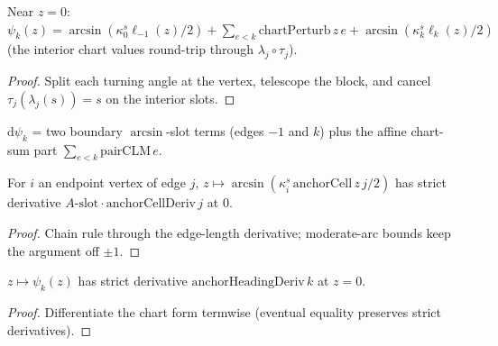 \begin{lemma}
  \label{lem:heading_anchor_cell_eventually_eq}
  Near $z = 0$: $\psi_k(z) = \arcsin(\kappa^s_0 \ell_{-1}(z)/2) +
  \sum_{e<k} \mathrm{chartPerturb}\,z\,e + \arcsin(\kappa^s_k \ell_k(z)/2)$
  (the interior chart values round-trip through $\lambda_j \circ \tau_j$).
\end{lemma}
\begin{proof}

\leanok
  Split each turning angle at the vertex, telescope the block, and cancel
  $\tau_j(\lambda_j(s)) = s$ on the interior slots.
\end{proof}

\begin{definition}
  \label{def:anchor_heading_deriv}
  $\mathrm{d}\psi_k$ = two boundary $\arcsin$-slot terms (edges $-1$ and $k$)
  plus the affine chart-sum part $\sum_{e<k} \mathrm{pairCLM}\,e$.
\end{definition}

\begin{lemma}
  \label{lem:has_strict_fderiv_at_anchor_slot}
  For $i$ an endpoint vertex of edge $j$,
  $z \mapsto \arcsin(\kappa^s_i\,\mathrm{anchorCell}\,z\,j/2)$ has strict
  derivative $A\text{-slot} \cdot \mathrm{anchorCellDeriv}\,j$ at $0$.
\end{lemma}
\begin{proof}

\leanok
  Chain rule through the edge-length derivative; moderate-arc bounds keep the
  argument off $\pm1$.
\end{proof}

\begin{lemma}
  \label{lem:has_strict_fderiv_at_anchor_heading}
  $z \mapsto \psi_k(z)$ has strict derivative
  $\mathrm{anchorHeadingDeriv}\,k$ at $z = 0$.
\end{lemma}
\begin{proof}

\leanok
  Differentiate the chart form termwise (eventual equality preserves strict
  derivatives).
\end{proof}

